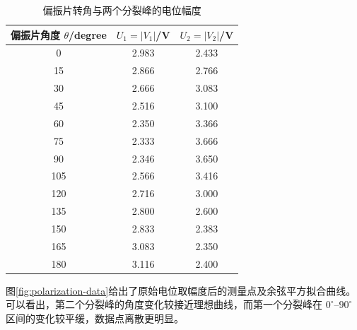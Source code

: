 \documentclass[UTF8,a4paper,10pt]{ctexart}
\begin{document}
\begin{table}[H]
  \centering
  \caption{偏振片转角与两个分裂峰的电位幅度}
  \label{tab:polarization-result}
  \begin{tabular}{ccc}
    \toprule
    偏振片角度 $\theta$/degree & $U_1=|V_1|$/V & $U_2=|V_2|$/V \\
    \midrule
    0   & 2.983 & 2.433 \\
    15  & 2.866 & 2.766 \\
    30  & 2.666 & 3.083 \\
    45  & 2.516 & 3.100 \\
    60  & 2.350 & 3.366 \\
    75  & 2.333 & 3.666 \\
    90  & 2.346 & 3.650 \\
    105 & 2.566 & 3.416 \\
    120 & 2.716 & 3.000 \\
    135 & 2.800 & 2.600 \\
    150 & 2.833 & 2.383 \\
    165 & 3.083 & 2.350 \\
    180 & 3.116 & 2.400 \\
    \bottomrule
  \end{tabular}
\end{table}

图\ref{fig:polarization-data}给出了原始电位取幅度后的测量点及余弦平方拟合曲线。可以看出，第二个分裂峰的角度变化较接近理想曲线，而第一个分裂峰在 $0^\circ$--$90^\circ$ 区间的变化较平缓，数据点离散更明显。
\end{document}
